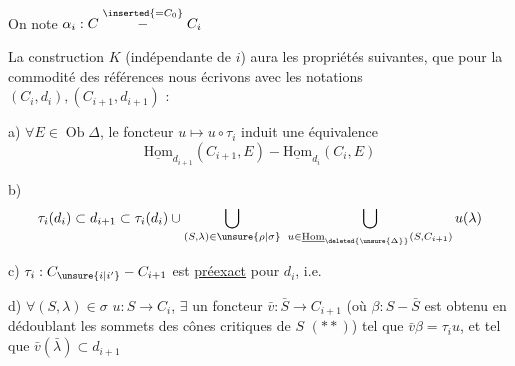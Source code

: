 On note $\alpha_i:C\mathrel{\overset{\inserted{=C_0}}{-}}C_i$

La construction $K$ (indépendante de $i$) aura les propriétés suivantes, que pour la commodité des références nous écrivons avec les notations $(C_i,d_i),(C_{i+1},d_{i+1})$ :

a) $\forall E\in\operatorname{Ob}\Delta$, le foncteur $u\mapsto u\circ\tau_i$ induit une équivalence
\[
 \underline{\mathrm{Hom}}_{d_{i+1}}(C_{i+1},E)-\underline{\mathrm{Hom}}_{d_i}(C_i,E)
\]

b)
\[
 \tau_i(d_i)\subset d_{i+1}\subset\tau_i(d_i)\cup
 \bigcup_{(S,\lambda)\in\unsure{\rho|\sigma}}\ \bigcup_{u\in\underline{\mathrm{Hom}}_{\deleted{\unsure{\Delta}}}(S,C_{i+1})}u(\lambda)
\]

c) $\tau_i:C_{\unsure{i|i'}}-C_{i+1}$ est \uline{préexact} pour  $d_i$, i.e.


d) $\forall(S,\lambda)\in\sigma$  $u:S\longrightarrow C_i$,    $\exists$ un foncteur $\bar v:\bar S\longrightarrow C_{i+1}$ (où $\beta:S-\bar S$ est obtenu en dédoublant les sommets des cônes critiques de $S$ $(**)$) tel que $\bar v\beta=\tau_i u$, et tel que $\bar v(\bar\lambda)\subset d_{i+1}$



